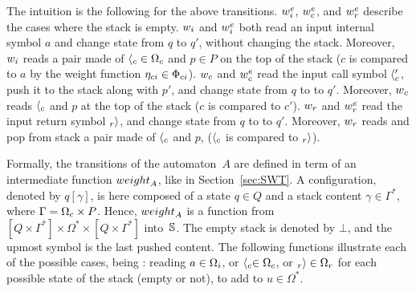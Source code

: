 \noindent
The intuition is the following for the above transitions.
$\weiei$, $\weiec$, and $\weier$ describe the cases where the stack is empty.
%
\noindent
$\weii$ and $\weiei$ both read an input internal symbol $a$ and change state from $q$ to $q'$,
without changing the stack.
Moreover, $\weii$ reads a pair made of
${\call{c}} \in \Omegac$ and $p \in P$ on the top of the stack
($c$ is compared to $a$ by the weight function $\eta_\mathsf{ci} \in \Phici$).
%
\noindent
$\weic$ and $\weiec$ read the input call symbol $\langle_{c}'$,
push it to the stack along with $p'$, and change state from $q$ to to $q'$.
Moreover, $\weic$ reads ${\langle_{c}}$ and $p$ at the top of the stack
($c$ is compared to $c'$).
%
\noindent
$\weir$ and $\weier$ read the input return symbol $_{r}{\rangle}$, and change state from $q$ to to $q'$.
Moreover, $\weir$ reads and pop from stack a pair made of $\langle_{c}$ and $p$,
($\langle_{c}$ is compared to $_{r}{\rangle}$).

Formally, the transitions of the automaton~$A$ are defined
in term of %
an intermediate function $\weight_A$, like in Section~\ref{sec:SWT}.
A configuration, denoted by $q[\gamma]$,
is here composed of a state $q \in Q$
and a stack content $\gamma \in \Gamma^*$,
where $\Gamma = \Omegac \times P$.
Hence, $\weight_A$ is a function from
$[Q \times \Gamma^*] \times \Omega^* \times [Q \times \Gamma^*]$ into~$\mathbb{S}$.
The empty stack is denoted by $\bot$, and the upmost symbol is the last pushed content.
The following functions illustrate each of the possible cases, being : reading $a \in \Omegai$,
or $\call{c} \in \Omegac$, or $\return{r} \in \Omegar$ for each possible state of the stack (empty or not),
to add to $u \in {\Omega}^*$.


